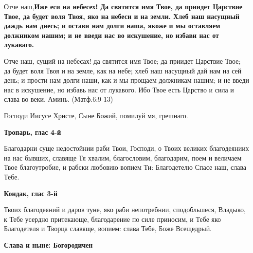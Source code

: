 

\label{_content_molitvi}

 

 

Отче наш,\bfseries  \normalfont{}Иже еси на небесех! Да святится имя Твое, да приидет Царствие Твое, да будет воля Твоя, яко на небеси и на земли. Хлеб наш насущный даждь нам днесь; и остави нам долги наша, якоже и мы оставляем должником нашим; и не введи нас во искушение, но избави нас от лукаваго.


Отче наш, сущий на небесах! да святится имя Твое; да приидет Царствие Твое; да будет воля Твоя и на земле, как на небе; хлеб наш насущный дай нам на сей день; и прости нам долги наши, как и мы прощаем должникам нашим; и не введи нас в искушение, но избавь нас от лукавого. Ибо Твое есть Царство и сила и слава во веки. Аминь. (Матф.6:9-13)\mychapterending

 

\begin{center}
Господи Иисусе Христе, Сыне Божий, помилуй мя, грешнаго. 
\end{center}
\mychapterending

 

\bfseries Тропарь, глас 4-й\normalfont{}\nopagebreak


Благодарни суще недостойнии раби Твои, Господи, о Твоих великих благодеяниих на нас бывших, славяще Тя хвалим, благословим, благодарим, поем и величаем Твое благоутробие, и рабски любовию вопием Ти: Благодетелю Спасе наш, слава Тебе.




\medskip


\bfseries Кондак, глас 3-й\normalfont{}\nopagebreak


Твоих благодеяний и даров туне, яко раби непотребнии, сподобльшеся, Владыко, к Тебе усердно притекающе, благодарение по силе приносим, и Тебе яко Благодетеля и Творца славяще, вопием: слава Тебе, Боже Всещедрый.


\medskip


\bfseries Слава и ныне: Богородичен\normalfont{}\nopagebreak


